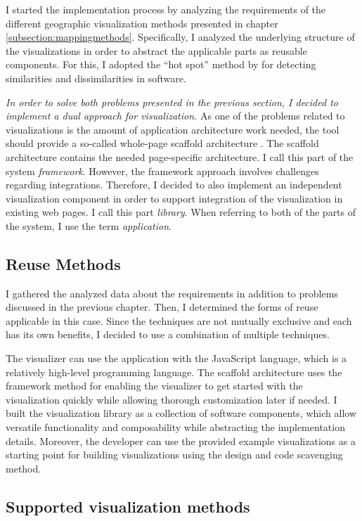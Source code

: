 I started the implementation process by analyzing the requirements of the different geographic visualization methods presented in chapter \ref{subsection:mappingmethods}. Specifically, I analyzed the underlying structure of the visualizations in order to abstract the applicable parts as reusable components. For this, I adopted the ``hot spot'' method by \citet{schmid_systematic_1997} for detecting similarities and dissimilarities in software.

\emph{In order to solve both problems presented in the previous section, I decided to implement a dual approach for visualization.} As one of the problems related to visualizations is the amount of application architecture work needed, the tool should provide a so-called whole-page scaffold architecture \citep{jazayeri_trends_2007}. The scaffold architecture contains the needed page-specific architecture. I call this part of the system \emph{framework}. However, the framework approach involves challenges regarding integrations. Therefore, I decided to also implement an independent visualization component in order to support integration of the visualization in existing web pages. I call this part \emph{library}. When referring to both of the parts of the system, I use the term \emph{application}.

\subsection{Reuse Methods}

I gathered the analyzed data about the requirements in addition to problems discussed in the previous chapter. Then, I  determined the forms of reuse applicable in this case. Since the techniques are not mutually exclusive and each has its own benefits, I decided to use a combination of multiple techniques. 

The visualizer can use the application with the JavaScript language, which is a relatively high-level programming language. The scaffold architecture uses the framework method for enabling the visualizer to get started with the visualization quickly while allowing thorough customization later if needed. I built the visualization library as a collection of software components, which allow versatile functionality and composability while abstracting the implementation details. Moreover, the developer can use the provided example visualizations as a starting point for building visualizations using the design and code scavenging method.

\subsection{Supported visualization methods}
\label{subsection:supportedvisualizationmethods}

